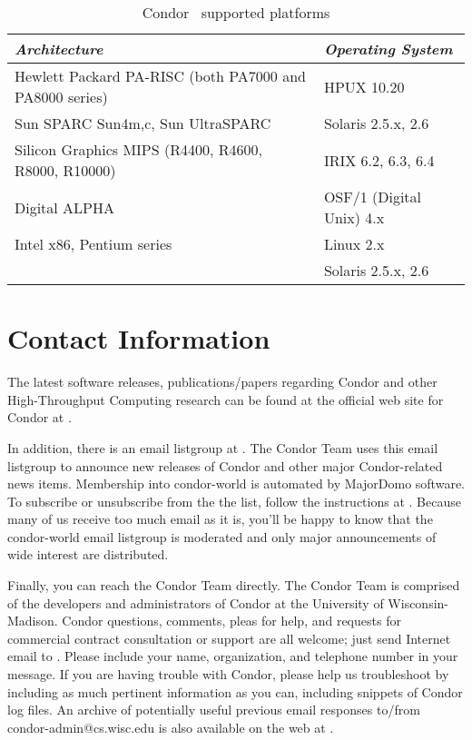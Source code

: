 \begin{center}
\begin{table}
\begin{tabular}{|ll|} \hline
\emph{Architecture} & \emph{Operating System} \\ \hline \hline
Hewlett Packard PA-RISC (both PA7000 and PA8000 series) & HPUX 10.20 \\ \hline
Sun SPARC Sun4{m,c}, Sun UltraSPARC & Solaris 2.5.x, 2.6 \\ \hline
Silicon Graphics MIPS (R4400, R4600, R8000, R10000) & IRIX 6.2, 6.3, 6.4 \\ \hline
Digital ALPHA & OSF/1 (Digital Unix) 4.x \\ \hline
Intel x86, Pentium series & Linux 2.x \\
 & Solaris 2.5.x, 2.6 \\ \hline
\end{tabular}
\caption{\label{supported-platforms}Condor \VersionNotice\ supported platforms}
\end{table}
\end{center}



\section{\label{contact-info}Contact Information}

The latest software releases, publications/papers regarding Condor and other 
High-Throughput Computing
research can be found at the official web site for Condor at  
.

In addition, there is an email listgroup at .  The Condor Team 
uses this email listgroup to announce new releases of Condor and other major Condor-related 
news items.  Membership into condor-world is automated by MajorDomo software.  To 
subscribe or unsubscribe from the the list, follow the instructions at  
.  Because many of us receive 
too much email as it is, you'll be happy to know that the condor-world email listgroup is 
moderated and only major announcements of wide interest are distributed.

Finally, you can reach the Condor Team directly.  The Condor Team is comprised of the 
developers and administrators of Condor at the University of Wisconsin-Madison. Condor 
questions, comments, pleas for help, and requests for commercial contract consultation or support 
are all welcome; just send Internet email to .  Please include your 
name, organization, and telephone number in your message.  If you are having trouble with 
Condor, please help us troubleshoot by including as much pertinent information as you can, 
including snippets of Condor log files.  An archive of potentially useful previous email responses 
to/from condor-admin@cs.wisc.edu is also available on the web at  
.



